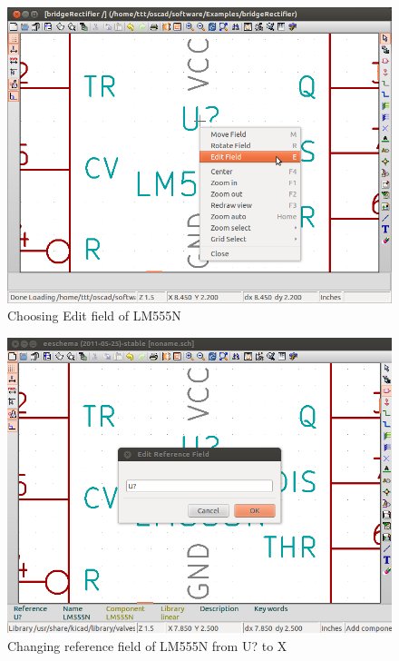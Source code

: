 \begin{figure}[t]%
\begin{center}
\includegraphics[width=1\linewidth]{figures/555-edit-field.png}%
\caption{Choosing Edit field of LM555N}
\label{555-edit-field}
\end{center}
\end{figure}


\begin{figure}[t]%
\begin{center}
\includegraphics[width=1\linewidth]{figures/555-ref-change.png}%
\caption{Changing reference field of LM555N from U? to X}
\label{555-ref-change}
\end{center}
\end{figure}


